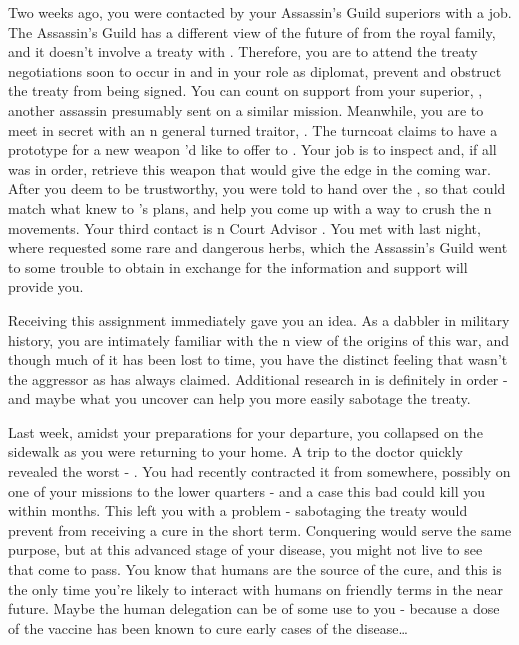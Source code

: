\documentclass[char]{NeptuneBall}
\begin{document}
Two weeks ago, you were contacted by your Assassin's Guild superiors with a job. The Assassin's Guild has a different view of the future of \pPacifica{} from the royal family, and it doesn't involve a treaty with \pAtlantis{}. Therefore, you are to attend the treaty negotiations soon to occur in \pAtlantis{} and in your role as diplomat, prevent and obstruct the treaty from being signed. You can count on support from your superior, \cDiplomat{}, another assassin presumably sent on a similar mission. Meanwhile, you are to meet in secret with an \pAtlantis{}n general turned traitor, \cGeneral{}. The turncoat claims to have a prototype for a new weapon \cGeneral{\they}'d like to offer to \pPacifica{}. Your job is to inspect and, if all was in order, retrieve this weapon that would give \pPacifica{} the edge in the coming war. After you deem \cGeneral{\them} to be trustworthy, you were told to hand over the \iBattlePlan{}, so that \cGeneral{\they} could match what \cGeneral{\they} knew to \pPacifica{}'s plans, and help you come up with a way to crush the \pAtlantis{}n movements. Your third contact is \pAtlantis{}n Court Advisor \cManta{}.  You met with \cManta{\them} last night, where \cManta{\they} requested some rare and dangerous herbs, which the Assassin's Guild went to some trouble to obtain in exchange for the information and support \cManta{} will provide you.

Receiving this assignment immediately gave you an idea. As a dabbler in military history, you are intimately familiar with the \pPacifica{}n view of the origins of this war, and though much of it has been lost to time, you have the distinct feeling that \pPacifica{} wasn't the aggressor as \pAtlantis{} has always claimed. Additional research in \pAtlantis{} is definitely in order - and maybe what you uncover can help you more easily sabotage the treaty. 

Last week, amidst your preparations for your departure, you collapsed on the sidewalk as you were returning to your home. A trip to the doctor quickly revealed the worst - \pPolio{}. You had recently contracted it from somewhere, possibly on one of your missions to the lower quarters - and a case this bad could kill you within months. This left you with a problem - sabotaging the treaty would prevent \pPacifica{} from receiving a cure in the short term. Conquering \pAtlantis{} would serve the same purpose, but at this advanced stage of your disease, you might not live to see that come to pass. You know that humans are the source of the cure, and this is the only time you're likely to interact with humans on friendly terms in the near future. Maybe the human delegation can be of some use to you - because a dose of the vaccine has been known to cure early cases of the disease\dots{}
\end{document}
